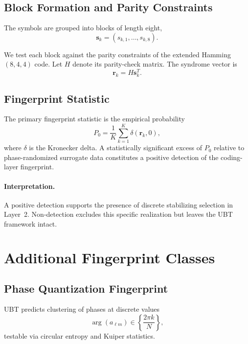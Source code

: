 \documentclass[11pt]{article}
\begin{document}
\subsection{Block Formation and Parity Constraints}

The symbols are grouped into blocks of length eight,
\begin{equation}
\mathbf{s}_k = (s_{k,1},\dots,s_{k,8}).
\end{equation}

We test each block against the parity constraints of the extended
Hamming $(8,4,4)$ code. Let $H$ denote its parity-check matrix. The
syndrome vector is
\begin{equation}
\mathbf{r}_k = H \mathbf{s}_k^{T}.
\end{equation}

\subsection{Fingerprint Statistic}

The primary fingerprint statistic is the empirical probability
\begin{equation}
P_0 = \frac{1}{K}\sum_{k=1}^K \delta(\mathbf{r}_k,0),
\end{equation}
where $\delta$ is the Kronecker delta. A statistically significant
excess of $P_0$ relative to phase-randomized surrogate data constitutes
a positive detection of the coding-layer fingerprint.

\paragraph{Interpretation.}
A positive detection supports the presence of discrete stabilizing
selection in Layer~2. Non-detection excludes this specific realization
but leaves the UBT framework intact.

\section{Additional Fingerprint Classes}

\subsection{Phase Quantization Fingerprint}

UBT predicts clustering of phases at discrete values
\begin{equation}
\arg(a_{\ell m}) \in \left\{\frac{2\pi k}{N}\right\},
\end{equation}
testable via circular entropy and Kuiper statistics.
\end{document}
